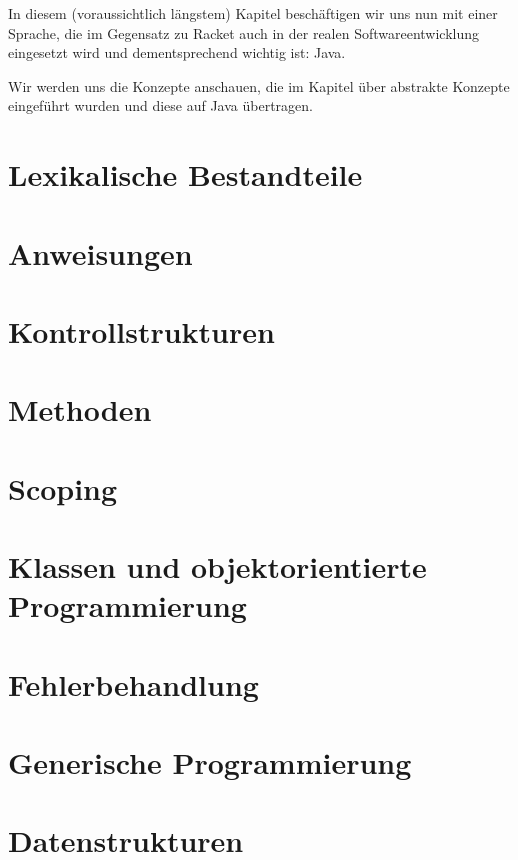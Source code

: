 In diesem (voraussichtlich längstem) Kapitel beschäftigen wir uns nun mit einer Sprache, die im Gegensatz zu Racket auch in der realen Softwareentwicklung eingesetzt wird und dementsprechend wichtig ist: Java.

Wir werden uns die Konzepte anschauen, die im Kapitel über abstrakte Konzepte eingeführt wurden und diese auf Java übertragen.

\section{Lexikalische Bestandteile}
	

\section{Anweisungen}
	

\section{Kontrollstrukturen}
	

\section{Methoden}
	

\section{Scoping}
	

\section{Klassen und objektorientierte Programmierung}
	

\section{Fehlerbehandlung}
	

\section{Generische Programmierung}
	

\section{Datenstrukturen}
	

